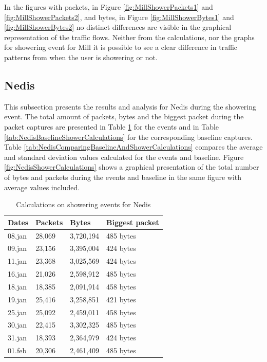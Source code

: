 In the figures with packets, in Figure \ref{fig:MillShowerPackets1} and \ref{fig:MillShowerPackets2}, and bytes, in Figure \ref{fig:MillShowerBytes1} and \ref{fig:MillShowerBytes2} no distinct differences are visible in the graphical representation of the traffic flows. Neither from the calculations, nor the graphs for showering event for Mill it is possible to see a clear difference in traffic patterns from when the user is showering or not. 

\newpage
\subsection{Nedis}
This subsection presents the results and analysis for Nedis during the showering event. The total amount of packets, bytes and the biggest packet during the packet captures are presented in Table \ref{tab:NedisShoweringCalculations} for the events and in Table \ref{tab:NedisBaselineShowerCalculations} for the corresponding baseline captures. Table \ref{tab:NedisComparingBaselineAndShowerCalculations} compares the average and standard deviation values calculated for the events and baseline. Figure \ref{fig:NedisShowerCalculations} shows a graphical presentation of the total number of bytes and packets during the events and baseline in the same figure with average values included.

\begin{table}[H]
\centering
    \caption{Calculations on showering events for Nedis}
\label{tab:NedisShoweringCalculations}
    \begin{tabular}{|l|l|l|l|}
        \hline
        \textbf{Dates} & \textbf{Packets} & \textbf{Bytes} & \textbf{Biggest packet} \\ \hline
        08.jan          & 28,069           & 3,720,194      & 485 bytes               \\ \hline
        09.jan          & 23,156           & 3,395,004      & 424 bytes               \\ \hline
        11.jan          & 23,368           & 3,025,569      & 424 bytes               \\ \hline
        16.jan          & 21,026           & 2,598,912      & 485 bytes               \\ \hline
        18.jan          & 18,385           & 2,091,914      & 458 bytes               \\ \hline
        19.jan          & 25,416           & 3,258,851      & 421 bytes               \\ \hline
        25.jan          & 25,092           & 2,459,011      & 458 bytes               \\ \hline
        30.jan          & 22,415           & 3,302,325      & 485 bytes               \\ \hline
        31.jan          & 18,393           & 2,364,979      & 424 bytes               \\ \hline
        01.feb          & 20,306           & 2,461,409      & 485 bytes               \\ \hline
    \end{tabular}
\end{table}

